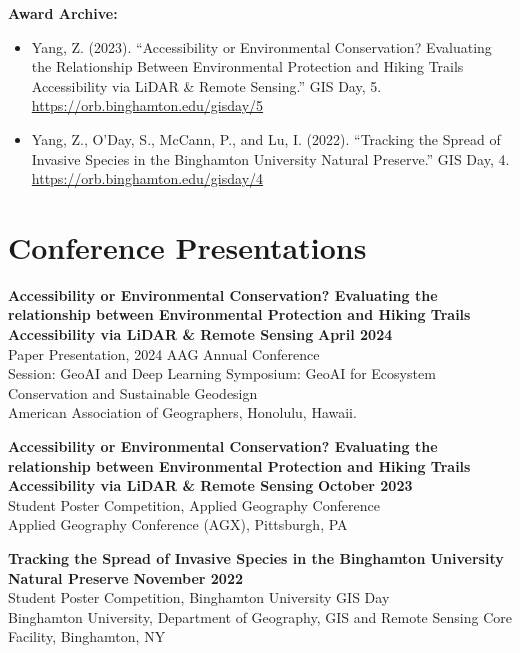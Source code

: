 \documentclass[11pt]{article}
\begin{document}
\vspace{2mm}
\noindent
\textbf{Award Archive:}
\begin{itemize}[leftmargin=*]
    \item Yang, Z. (2023). ``Accessibility or Environmental Conservation? Evaluating the Relationship Between Environmental Protection and Hiking Trails Accessibility via LiDAR \& Remote Sensing.'' GIS Day, 5. \href{https://orb.binghamton.edu/gisday/5}{https://orb.binghamton.edu/gisday/5}
    \item Yang, Z., O'Day, S., McCann, P., and Lu, I. (2022). ``Tracking the Spread of Invasive Species in the Binghamton University Natural Preserve.'' GIS Day, 4. \href{https://orb.binghamton.edu/gisday/4}{https://orb.binghamton.edu/gisday/4}
\end{itemize}

\section*{Conference Presentations}
\noindent
\textbf{Accessibility or Environmental Conservation? Evaluating the relationship between Environmental Protection and Hiking Trails Accessibility via LiDAR \& Remote Sensing} \hfill \textbf{April 2024} \\
Paper Presentation, 2024 AAG Annual Conference \\
Session: GeoAI and Deep Learning Symposium: GeoAI for Ecosystem Conservation and Sustainable Geodesign \\
American Association of Geographers, Honolulu, Hawaii.

\vspace{2mm}
\noindent
\textbf{Accessibility or Environmental Conservation? Evaluating the relationship between Environmental Protection and Hiking Trails Accessibility via LiDAR \& Remote Sensing} \hfill \textbf{October 2023} \\
Student Poster Competition, Applied Geography Conference \\
Applied Geography Conference (AGX), Pittsburgh, PA

\vspace{2mm}
\noindent
\textbf{Tracking the Spread of Invasive Species in the Binghamton University Natural Preserve} \hfill \textbf{November 2022} \\
Student Poster Competition, Binghamton University GIS Day \\
Binghamton University, Department of Geography, GIS and Remote Sensing Core Facility, Binghamton, NY
\end{document}
